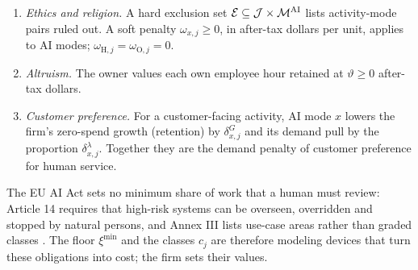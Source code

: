 \begin{assumption}
\begin{enumerate}
\item[(iii)] \emph{Ethics and religion.} A hard exclusion set $\mathcal E\subseteq\mathcal J\times\mathcal M^{\rm AI}$ lists activity-mode pairs ruled out. A soft penalty $\omega_{x,j}\ge0$, in after-tax dollars per unit, applies to AI modes; $\omega_{\mathrm H,j}=\omega_{\mathrm O,j}=0$.
\item[(iv)] \emph{Altruism.} The owner values each own employee hour retained at $\vartheta\ge0$ after-tax dollars.
\item[(v)] \emph{Customer preference.} For a customer-facing activity, AI mode $x$ lowers the firm's zero-spend growth (retention) by $\delta^G_{x,j}$ and its demand pull by the proportion $\delta^\lambda_{x,j}$. Together they are the demand penalty of customer preference for human service.
\end{enumerate}
\end{assumption}

The EU AI Act sets no minimum share of work that a human must review: Article 14 requires that high-risk systems can be overseen, overridden and stopped by natural persons, and Annex III lists use-case areas rather than graded classes \citep{eu2024regulation}. The floor $\xi^{\min}$ and the classes $c_j$ are therefore modeling devices that turn these obligations into cost; the firm sets their values.

